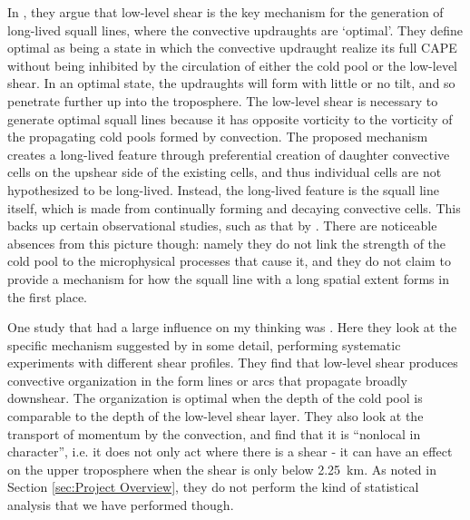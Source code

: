 \documentclass[11pt,a4paper]{article}
\newcommand\todo[1]{\textbf{TODO: #1}}
\begin{document}

In \cite{RKW1988}, they argue that low-level shear is the key mechanism for the generation of long-lived squall lines, where the convective updraughts are `optimal'. They define optimal as being a state in which the convective updraught realize its full CAPE without being inhibited by the circulation of either the cold pool or the low-level shear. In an optimal state, the updraughts will form with little or no tilt, and so penetrate further up into the troposphere. The low-level shear is necessary to generate optimal squall lines because it has opposite vorticity to the vorticity of the propagating cold pools formed by convection. The proposed mechanism creates a long-lived feature through preferential creation of daughter convective cells on the upshear side of the existing cells, and thus individual cells are not hypothesized to be long-lived. Instead, the long-lived feature is the squall line itself, which is made from continually forming and decaying convective cells. This backs up certain observational studies, such as that by \cite{houze1977structure}. There are noticeable absences from this picture though: namely they do not link the strength of the cold pool to the microphysical processes that cause it, and they do not claim to provide a mechanism for how the squall line with a long spatial extent forms in the first place. %

One study that had a large influence on my thinking was \cite{RE2001}. Here they look at the specific mechanism suggested by \cite{RKW1988} in some detail, performing systematic experiments with different shear profiles. They find that low-level shear produces convective organization in the form lines or arcs that propagate broadly downshear. The organization is optimal when the depth of the cold pool is comparable to the depth of the low-level shear layer. They also look at the transport of momentum by the convection, and find that it is ``nonlocal in character'', i.e. it does not only act where there is a shear - it can have an effect on the upper troposphere when the shear is only below \SI{2.25}{km}. As noted in Section \ref{sec:Project Overview}, they do not perform the kind of statistical analysis that we have performed though.
\end{document}
